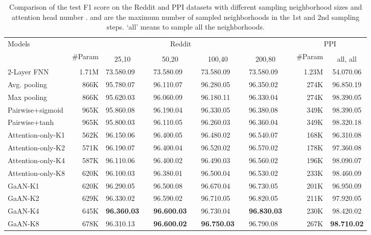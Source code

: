 \documentclass{article}
\begin{document}
	\begin{table*}[!ht]
		\centering
		\caption{Comparison of the test F1 score on the Reddit and PPI datasets with different sampling neighborhood sizes and attention head number .  and  are the maximum number of sampled neighborhoods in the 1st and 2nd sampling steps. `all' means to sample all the neighborhoods.}
		\begin{tabular}{l |r m{1.2cm}p{0.01cm} m{1.2cm}p{0.01cm} m{1.2cm}p{0.01cm} m{1.2cm}p{0.01cm} | r c }
			\hline
			\multirow{3}{*}{Models} &  \multicolumn{9}{c}{Reddit} &\multicolumn{2}{c}{PPI} \\
			& \multirow{2}{*}{\#Param}  & \multicolumn{1}{c}{} & & \multicolumn{1}{c}{} & & \multicolumn{1}{c}{} & & \multicolumn{1}{c}{} & & \multirow{2}{*}{\#Param}  & \multicolumn{1}{c}{} \\
			\cline{3-3}  \cline{5-5} \cline{7-7} \cline{9-9} \cline{12-12}
			&  &  \multicolumn{1}{c}{25,10}  && \multicolumn{1}{c}{50,20}   && \multicolumn{1}{c}{100,40}   && \multicolumn{1}{c}{200,80} && & all, all \\
			\hline \hline
			2-Layer FNN & 1.71M  & 73.580.09  && 73.580.09 && 73.580.09 && 73.580.09 && 1.23M & 54.070.06\\ 
			Avg. pooling      & 866K & 95.780.07  && 96.110.07 && 96.280.05 && 96.350.02 && 274K & 96.850.19 \\ 
			Max pooling      & 866K & 95.620.03  && 96.060.09 && 96.180.11 && 96.330.04 && 274K & 98.390.05 \\
			Pairwise+sigmoid      & 965K & 95.860.08  && 96.190.04 && 96.330.05 && 96.380.08 && 349K & 98.390.05  \\
			Pairwise+tanh      & 965K & 95.800.03  && 96.110.05 && 96.260.03 && 96.360.04 && 349K & 98.320.18  \\  \hline\hline
			Attention-only-K1  & 562K & 96.150.06  && 96.400.05 && 96.480.02 && 96.540.07 && 168K & 96.310.08  \\
			Attention-only-K2    & 571K & 96.190.07  && 96.400.04 && 96.520.02 && 96.570.02 && 178K & 97.360.08  \\
			Attention-only-K4    & 587K & 96.110.06  && 96.400.02 && 96.490.03 && 96.560.02 && 196K & 98.090.07  \\
			Attention-only-K8    & 620K & 96.100.03  && 96.380.01 && 96.500.04 && 96.530.02 && 233K & 98.460.09  \\ \hline
			GaAN-K1   & 620K & 96.290.05 && 96.500.08 && 96.670.04 && 96.730.05 && 201K & 96.950.09  \\
			GaAN-K2   & 629K & 96.330.02 && 96.590.02 && 96.710.05 && 96.820.05 && 211K & 97.920.05  \\
			GaAN-K4   & 645K & \textbf{96.360.03} && \textbf{96.600.03} && 96.730.04 && \textbf{96.830.03} && 230K & 98.420.02 \\
			GaAN-K8   & 678K & 96.310.13 && \textbf{96.600.02} && \textbf{96.750.03} && 96.790.08 && 267K & \textbf{98.710.02}  \\
			\hline
		\end{tabular}
		\label{table:result_reddit_ppi}
	\end{table*}
	
\end{document}
